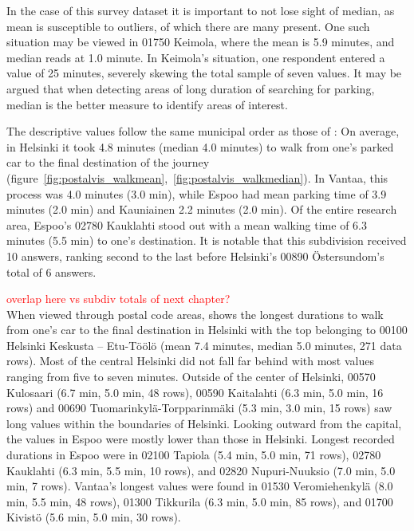 In the case of this survey dataset it is important to not lose sight of median, as mean is susceptible to outliers, of which there are many present. One such situation may be viewed in 01750 Keimola, where the mean  is 5.9 minutes, and median reads at 1.0 minute. In Keimola's situation, one respondent entered a  value of 25 minutes, severely skewing the total sample of seven values. It may be argued that when detecting areas of long duration of searching for parking, median is the better measure to identify areas of interest.

The descriptive  values follow the same municipal order as those of : On average, in Helsinki it took 4.8 minutes (median 4.0 minutes) to walk from one's parked car to the final destination of the journey (figure~\ref{fig:postalvis_walkmean},~\ref{fig:postalvis_walkmedian}). In Vantaa, this process was 4.0 minutes (3.0 min), while Espoo had mean parking time of 3.9 minutes (2.0 min) and Kauniainen 2.2 minutes (2.0 min). Of the entire research area, Espoo's 02780 Kauklahti stood out with a mean walking time of 6.3 minutes (5.5 min) to one's destination. It is notable that this subdivision received 10 answers, ranking second to the last before Helsinki's 00890 Östersundom's total of 6 answers.

\textcolor{red}{overlap here vs subdiv totals of next chapter?}\\
When viewed through postal code areas,  shows the longest durations to walk from one's car to the final destination in Helsinki with the top belonging to 00100 Helsinki Keskusta -- Etu-Töölö (mean 7.4 minutes, median 5.0 minutes, 271 data rows). Most of the central Helsinki did not fall far behind with most values ranging from five to seven minutes. Outside of the center of Helsinki, 00570 Kulosaari (6.7 min, 5.0 min, 48 rows), 00590 Kaitalahti (6.3 min, 5.0 min, 16 rows) and 00690 Tuomarinkylä-Torpparinmäki (5.3 min, 3.0 min, 15 rows) saw long  values within the boundaries of Helsinki. Looking outward from the capital, the  values in Espoo were mostly lower than those in Helsinki. Longest recorded durations in Espoo were in 02100 Tapiola (5.4 min, 5.0 min, 71 rows), 02780 Kauklahti (6.3 min, 5.5 min, 10 rows), and 02820 Nupuri-Nuuksio (7.0 min, 5.0 min, 7 rows). Vantaa's longest  values were found in 01530 Veromiehenkylä (8.0 min, 5.5 min, 48 rows), 01300 Tikkurila (6.3 min, 5.0 min, 85 rows), and 01700 Kivistö (5.6 min, 5.0 min, 30 rows). 

